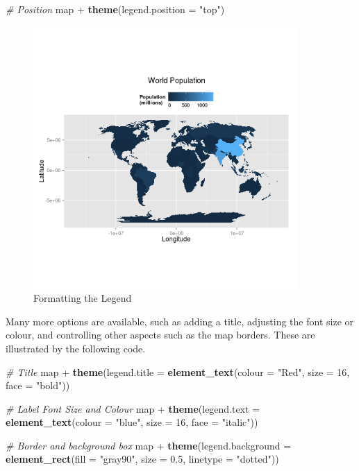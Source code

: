 \documentclass[]{article}
\newenvironment{Shaded}{}{}
\newcommand{\KeywordTok}[1]{\textcolor[rgb]{0.00,0.44,0.13}{\textbf{{#1}}}}
\newcommand{\DataTypeTok}[1]{\textcolor[rgb]{0.56,0.13,0.00}{{#1}}}
\newcommand{\DecValTok}[1]{\textcolor[rgb]{0.25,0.63,0.44}{{#1}}}
\newcommand{\FloatTok}[1]{\textcolor[rgb]{0.25,0.63,0.44}{{#1}}}
\newcommand{\StringTok}[1]{\textcolor[rgb]{0.25,0.44,0.63}{{#1}}}
\newcommand{\CommentTok}[1]{\textcolor[rgb]{0.38,0.63,0.69}{\textit{{#1}}}}
\newcommand{\NormalTok}[1]{{#1}}
\let\Oldincludegraphics\includegraphics
\renewcommand{\includegraphics}[1]{\Oldincludegraphics[width=10cm]{#1}}
\begin{document}
\begin{Shaded}
\begin{Highlighting}[]
\CommentTok{# Position}
\NormalTok{map + }\KeywordTok{theme}\NormalTok{(}\DataTypeTok{legend.position =} \StringTok{"top"}\NormalTok{)}
\end{Highlighting}
\end{Shaded}
\begin{figure}[htbp]
\centering
\includegraphics{figure/Formatting_the_Legend.png}
\caption{Formatting the Legend}
\end{figure}

Many more options are available, such as adding a title, adjusting the font size or colour, and controlling other aspects such as the map borders. These are illustrated by the following code.

\begin{Shaded}
\begin{Highlighting}[]
\CommentTok{# Title}
\NormalTok{map + }\KeywordTok{theme}\NormalTok{(}\DataTypeTok{legend.title =} \KeywordTok{element_text}\NormalTok{(}\DataTypeTok{colour =} \StringTok{"Red"}\NormalTok{, }\DataTypeTok{size =} \DecValTok{16}\NormalTok{, }\DataTypeTok{face =} \StringTok{"bold"}\NormalTok{))}

\CommentTok{# Label Font Size and Colour}
\NormalTok{map + }\KeywordTok{theme}\NormalTok{(}\DataTypeTok{legend.text =} \KeywordTok{element_text}\NormalTok{(}\DataTypeTok{colour =} \StringTok{"blue"}\NormalTok{, }\DataTypeTok{size =} \DecValTok{16}\NormalTok{, }\DataTypeTok{face =} \StringTok{"italic"}\NormalTok{))}

\CommentTok{# Border and background box}
\NormalTok{map + }\KeywordTok{theme}\NormalTok{(}\DataTypeTok{legend.background =} \KeywordTok{element_rect}\NormalTok{(}\DataTypeTok{fill =} \StringTok{"gray90"}\NormalTok{, }\DataTypeTok{size =} \FloatTok{0.5}\NormalTok{, }\DataTypeTok{linetype =} \StringTok{"dotted"}\NormalTok{))}
\end{Highlighting}
\end{Shaded}
\end{document}

